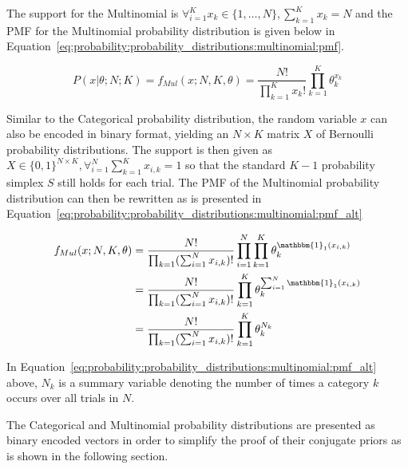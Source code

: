 \noindent
The support for the Multinomial is $\forall_{i=1}^{K} x_{k} \in \{1, \dots, N\}, \sum_{k=1}^{K}x_{k} = N$ and the \acs{PMF} for the Multinomial probability distribution is given below in Equation~\eqref{eq:probability:probability_distributions:multinomial:pmf}.

\begin{equation}
      \label{eq:probability:probability_distributions:multinomial:pmf}
      P(x \vert \theta; N; K) = f_{Mul}(x; N, K, \theta) = \frac{N!}{\prod_{k=1}^{K}x_{k}!} \prod_{k=1}^{K}\theta_{k}^{x_{k}}
\end{equation}

\noindent
Similar to the Categorical probability distribution, the random variable $x$ can also be encoded in binary format, yielding an $N \times K$ matrix $X$ of Bernoulli probability distributions. The support is then given as $X \in \{0, 1\}^{N \times K}, \forall_{i=1}^{N}\sum_{k=1}^{K} x_{i,k} = 1$ so that the standard $K-1$ probability simplex $S$ still holds for each trial. The \acs{PMF} of the Multinomial probability distribution can then be rewritten as is presented in Equation~\eqref{eq:probability:probability_distributions:multinomial:pmf_alt}

\begin{equation}
      \label{eq:probability:probability_distributions:multinomial:pmf_alt}
      \begin{split}
            f_{Mul}(x; N, K, \theta) &= \frac{N!}{\prod_{k=1}(\sum_{i=1}^{N}x_{i, k})!}\prod_{i=1}^{N}\prod_{k=1}^{K}\theta_{k}^{\mathbbm{1}_{1}(x_{i,k})} \\
            &= \frac{N!}{\prod_{k=1}(\sum_{i=1}^{N}x_{i, k})!} \prod_{k=1}^{K}\theta_{k}^{\sum_{i=1}^{N}\mathbbm{1}_{1}(x_{i,k})} \\
            &= \frac{N!}{\prod_{k=1}(\sum_{i=1}^{N}x_{i, k})!} \prod_{k=1}^{K}\theta_{k}^{N_{k}} \\
      \end{split}
\end{equation}

\noindent
In Equation~\eqref{eq:probability:probability_distributions:multinomial:pmf_alt} above, $N_{k}$ is a summary variable denoting the number of times a category $k$ occurs over all trials in $N$.

The Categorical and Multinomial probability distributions are presented as binary encoded vectors in order to simplify the proof of their conjugate priors as is shown in the following section.


